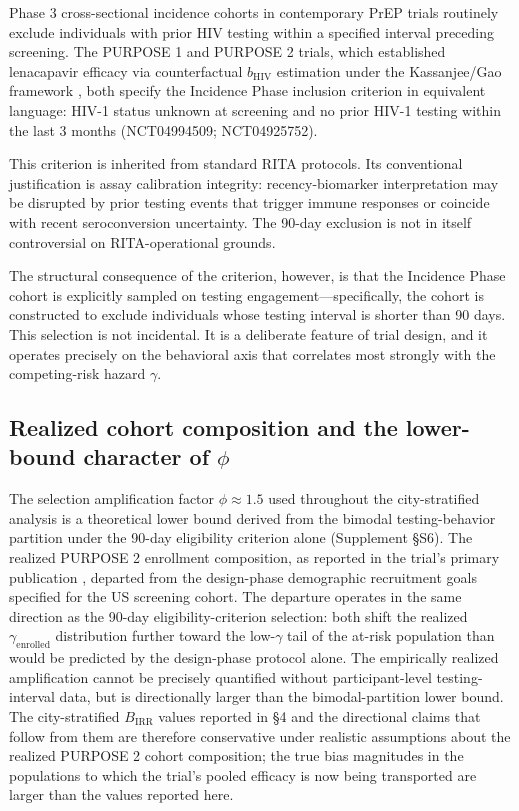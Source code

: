 \documentclass[12pt]{article}
\begin{document}
Phase 3 cross-sectional incidence cohorts in contemporary PrEP trials routinely exclude individuals with prior HIV testing within a specified interval preceding screening. The PURPOSE 1 and PURPOSE 2 trials, which established lenacapavir efficacy via counterfactual $b_{\mathrm{HIV}}$ estimation under the Kassanjee/Gao framework \cite{bekker2024,kelley2025}, both specify the Incidence Phase inclusion criterion in equivalent language: HIV-1 status unknown at screening and no prior HIV-1 testing within the last 3 months (NCT04994509; NCT04925752).

This criterion is inherited from standard RITA protocols. Its conventional justification is assay calibration integrity: recency-biomarker interpretation may be disrupted by prior testing events that trigger immune responses or coincide with recent seroconversion uncertainty. The 90-day exclusion is not in itself controversial on RITA-operational grounds.

The structural consequence of the criterion, however, is that the Incidence Phase cohort is explicitly sampled on testing engagement---specifically, the cohort is constructed to exclude individuals whose testing interval is shorter than 90 days. This selection is not incidental. It is a deliberate feature of trial design, and it operates precisely on the behavioral axis that correlates most strongly with the competing-risk hazard $\gamma$.

\subsection{Realized cohort composition and the lower-bound character of \texorpdfstring{$\phi$}{phi}}

The selection amplification factor $\phi \approx 1.5$ used throughout the city-stratified analysis is a theoretical lower bound derived from the bimodal testing-behavior partition under the 90-day eligibility criterion alone (Supplement \S S6). The realized PURPOSE 2 enrollment composition, as reported in the trial's primary publication \cite{kelley2025}, departed from the design-phase demographic recruitment goals specified for the US screening cohort. The departure operates in the same direction as the 90-day eligibility-criterion selection: both shift the realized $\gamma_{\mathrm{enrolled}}$ distribution further toward the low-$\gamma$ tail of the at-risk population than would be predicted by the design-phase protocol alone. The empirically realized amplification cannot be precisely quantified without participant-level testing-interval data, but is directionally larger than the bimodal-partition lower bound. The city-stratified $B_{\mathrm{IRR}}$ values reported in \S 4 and the directional claims that follow from them are therefore conservative under realistic assumptions about the realized PURPOSE 2 cohort composition; the true bias magnitudes in the populations to which the trial's pooled efficacy is now being transported are larger than the values reported here.
\end{document}
